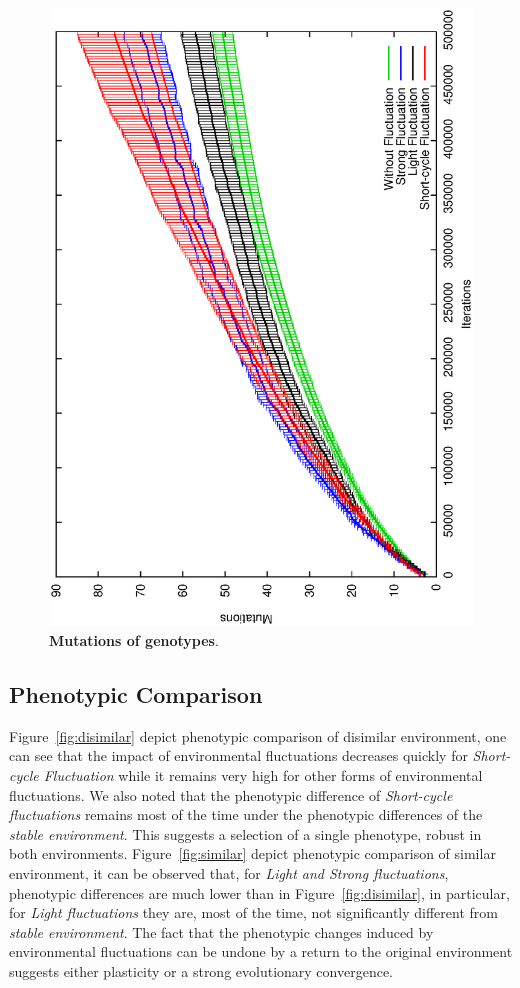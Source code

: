 \begin{figure}[h]
\centering
\includegraphics[width=0.7\columnwidth, angle =-90 ]{img/Mutations}
\caption{\textbf{Mutations of genotypes}.
}
\label{fig:Mutations}
\end{figure}

\subsection{Phenotypic Comparison}
Figure~\ref{fig:disimilar} depict phenotypic comparison of disimilar environment, one can see that the impact of environmental fluctuations decreases quickly for \emph{Short-cycle  Fluctuation} while it remains very high for other forms of environmental fluctuations. We also noted that the phenotypic difference of \emph{Short-cycle fluctuations} remains most of the time under the phenotypic differences of the \emph{stable environment}. This suggests a selection of a single phenotype, robust in both environments. Figure~\ref{fig:similar} depict phenotypic comparison of similar environment, it can be observed that, for \emph{Light and Strong fluctuations}, phenotypic differences are much lower than in Figure~\ref{fig:disimilar}, in particular, for \emph{Light fluctuations} they are, most of the time, not significantly different from \emph{stable environment}. The fact that the phenotypic changes induced by environmental fluctuations can be undone by a return to the original environment suggests either plasticity or a strong evolutionary convergence.

